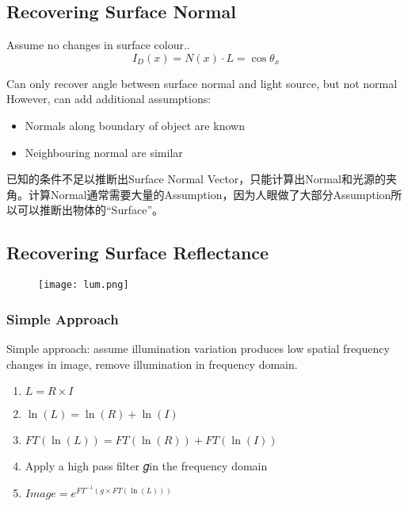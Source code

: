 \documentclass[11pt]{article}
\begin{document}
\subsection{Recovering Surface Normal}
Assume no changes in surface colour..
$$I_D(x)=N(x)\cdot L=\cos \theta_x$$

Can only recover angle between surface normal and light source, but not normal
\\
However, can add additional assumptions:
\begin{itemize}
    \item Normals along boundary of object are known
    \item Neighbouring normal are similar
\end{itemize}
\begin{framed}
    \begin{center}
        已知的条件不足以推断出Surface Normal Vector，只能计算出Normal和光源的夹角。计算Normal通常需要大量的Assumption，因为人眼做了大部分Assumption所以可以推断出物体的“Surface”。
    \end{center}
\end{framed}
\subsection{Recovering Surface Reflectance}
\begin{figure}[hbt!]
    \centering
    \texttt{[image: lum.png]}
\end{figure}
\subsubsection{Simple Approach}
Simple approach: assume illumination variation
produces low spatial frequency changes in image,
remove illumination in frequency domain.
\begin{enumerate}
    \item $L=R\times I$
    \item $\ln (L)=\ln (R) + \ln (I)$
    \item $FT(\ln (L))=FT(\ln (R)) + FT(\ln (I))$
    \item Apply a high pass filter 𝑔in the frequency domain
    \item $Image=e^{FT^{-1}(g\times FT(\ln (L)))}$
\end{enumerate}
\end{document}
